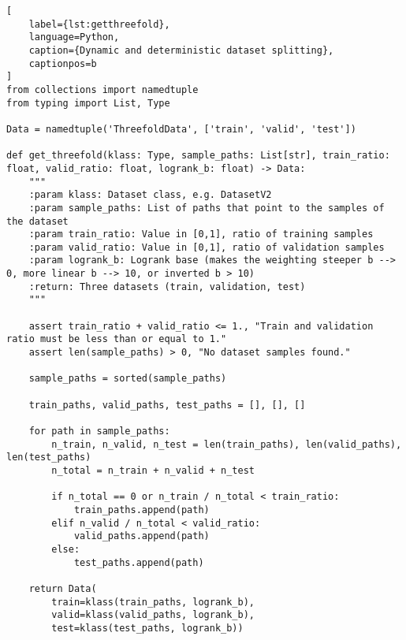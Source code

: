\begin{lstlisting}[
    label={lst:getthreefold},
    language=Python,
    caption={Dynamic and deterministic dataset splitting},
    captionpos=b
]
from collections import namedtuple
from typing import List, Type

Data = namedtuple('ThreefoldData', ['train', 'valid', 'test'])

def get_threefold(klass: Type, sample_paths: List[str], train_ratio: float, valid_ratio: float, logrank_b: float) -> Data:
    """
    :param klass: Dataset class, e.g. DatasetV2
    :param sample_paths: List of paths that point to the samples of the dataset
    :param train_ratio: Value in [0,1], ratio of training samples
    :param valid_ratio: Value in [0,1], ratio of validation samples
    :param logrank_b: Logrank base (makes the weighting steeper b --> 0, more linear b --> 10, or inverted b > 10)
    :return: Three datasets (train, validation, test)
    """

    assert train_ratio + valid_ratio <= 1., "Train and validation ratio must be less than or equal to 1."
    assert len(sample_paths) > 0, "No dataset samples found."

    sample_paths = sorted(sample_paths)

    train_paths, valid_paths, test_paths = [], [], []

    for path in sample_paths:
        n_train, n_valid, n_test = len(train_paths), len(valid_paths), len(test_paths)
        n_total = n_train + n_valid + n_test

        if n_total == 0 or n_train / n_total < train_ratio:
            train_paths.append(path)
        elif n_valid / n_total < valid_ratio:
            valid_paths.append(path)
        else:
            test_paths.append(path)

    return Data(
        train=klass(train_paths, logrank_b),
        valid=klass(valid_paths, logrank_b),
        test=klass(test_paths, logrank_b))
\end{lstlisting}
